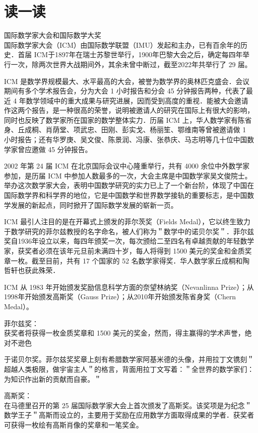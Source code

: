 \documentclass[10pt]{article}
\begin{document}
\section*{读一读}
国际数学家大会和国际数学大奖\\
国际数学家大会（ICM）由国际数学联盟（IMU）发起和主办，已有百余年的历史．首届 ICM于1897年在瑞士苏黎世举行，1900年巴黎大会之后，确定每四年举行一次，除两次世界大战期间外，其余未曾中断过，截至2022年共举行了 29 届。

ICM 是数学界规模最大、水平最高的大会，被誉为数学界的奥林匹克盛会．会议期间有多个学术报告会，分为大会 1 小时报告和分会 45 分钟报告两种，代表了最近 4 年数学领域中的重大成果与研究进展，因而受到高度的重视．能被大会邀请作这两个报告，是一种很高的荣誉，说明被邀请人的研究在国际上有很大的影响，同时也反映了数学家所在国家的数学整体实力．历届 ICM 上，华人数学家有陈省身、丘成桐、肖荫堂、项武忠、田刚、彭实戈、杨丽笙、鄂维南等曾被邀请做 1 小时报告；还有华罗庚、吴文俊、陈景润、冯康、张恭庆、马志明等几十位中国数学家曾应邀做 45 分钟报告。

2002 年第 24 届 ICM 在北京国际会议中心隆重举行，共有 4000 余位中外数学家参加，是历届 ICM 中参加人数最多的一次，大会主席是中国数学家吴文俊院士。举办这次数学家大会，表明中国数学研究的实力已上了一个新台阶，体现了中国在国际数学界和科学界的地位，它是中国数学和世界数学接轨的重要标志，是中国数学发展的新起点，同时掀开了国际数学发展的崭新一页。

ICM 最引人注目的是在开幕式上颁发的菲尔茨奖（Fields Medal），它以终生致力于数学研究的菲尔兹教授的名字命名，被人们称为＂数学中的诺贝尔奖＂．菲尔兹奖自1936年设立以来，每四年颁奖一次，每次颁给二至四名有卓越贡献的年轻数学家，获奖者必须在该年元旦前未满四十岁，每人将得到 1500 美元的奖金和金质奖章一枚。截至目前，共有 17 个国家的 52 名数学家得奖．华人数学家丘成桐和陶哲轩也获此殊荣．

ICM 从 1983 年开始颁发奖励信息科学方面的奈望林纳奖（Nevanlinna Prize）；从1998年开始颁发高斯奖（Gauss Prize）；从2010年开始颁发陈省身奖（Chern Medal）。

菲尔兹奖：\\
获奖者将获得一枚金质奖章和 1500 美元的奖金，然而，得主赢得的学术声誉，绝对不逊色

于诺贝尔奖。菲尔兹奖奖章上刻有希腊数学家阿基米德的头像，并用拉丁文镌刻＂超越人类极限，做宇宙主人＂的格言，背面用拉丁文写着：＂全世界的数学家们：为知识作出新的贡献而自豪。＂

高斯奖：\\
在马德里召开的第 25 届国际数学家大会上首次颁发了高斯奖。该奖项是为纪念＂数学王子＂高斯而设立的，主要用于奖励在应用数学方面取得成果的学者．获奖者可获得一枚绘有高斯肖像的奖章和一笔奖金。
\end{document}
